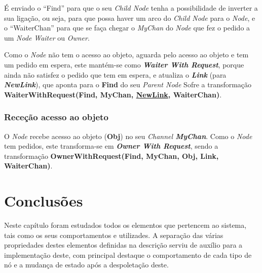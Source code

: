 É enviado o ``Find'' para que o seu \emph{Child Node} tenha a possibilidade de inverter a sua ligação, ou seja, para que possa haver um arco do \emph{Child Node} para o \emph{Node}, 
e o ``WaiterChan'' para que se faça chegar o \emph{MyChan} do \emph{Node} que fez o pedido a um \emph{Node} \emph{Waiter} ou \emph{Owner}.

Como o \emph{Node} não tem o acesso ao objeto, aguarda pelo acesso ao objeto e tem um pedido em espera, este mantém-se como \emph{\textbf{Waiter With Request}},
porque ainda não satisfez o pedido que tem em espera, 
e atualiza o \textbf{\emph{Link}} (para \textbf{\emph{NewLink}}), que aponta para o \textbf{Find} do seu \emph{Parent Node}
Sofre a transformação \textbf{WaiterWithRequest(Find, MyChan, \underline{NewLink}, WaiterChan)}.


\subsubsection*{Receção acesso ao objeto}
O \emph{Node} recebe acesso ao objeto (\textbf{Obj}) no seu \emph{Channel \textbf{MyChan}}.
Como o \emph{Node} tem pedidos, este transforma-se em \textbf{\emph{Owner With Request}}, sendo a transformação \textbf{OwnerWithRequest(Find, MyChan, Obj, Link, WaiterChan)}.


\section{Conclusões}
Neste capítulo foram estudados todos os elementos que pertencem ao sistema,
tais como os seus comportamentos e utilizades.
A separação das várias propriedades destes elementos definidas na descrição serviu de auxílio para a implementação deste, com principal destaque o comportamento de cada tipo de nó e a mudança de estado após a despoletação deste.

